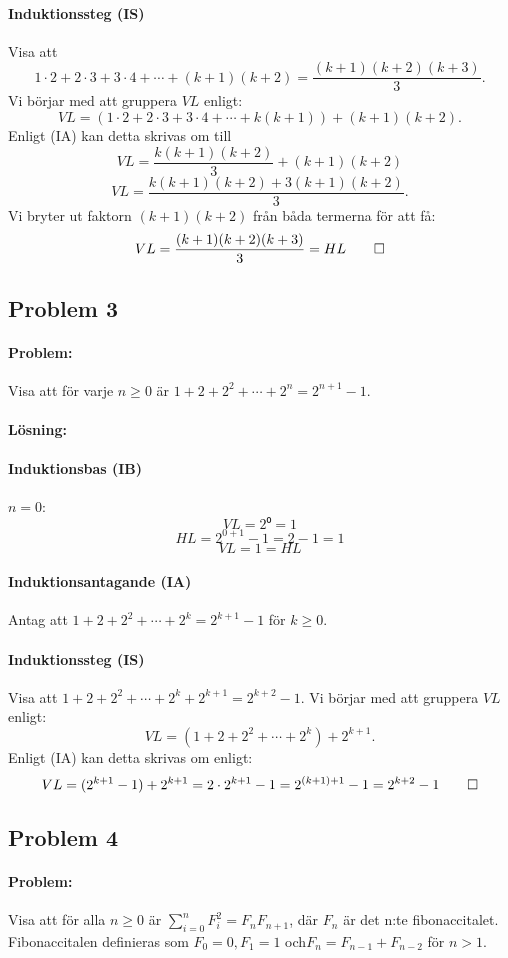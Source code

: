 \documentclass[12pt]{article}
\begin{document}
\paragraph{Induktionssteg (IS)} Visa att 
\[1\cdot 2+2\cdot 3+3\cdot 4+\cdots +(k+1)(k+2)=\frac{(k+1)(k+2)(k+3)}{3}.\]
Vi börjar med att gruppera $VL$ enligt:
\[VL = (1\cdot 2+2\cdot 3+3\cdot 4+\cdots +k(k+1))+(k+1)(k+2).\]
Enligt (IA) kan detta skrivas om till 
\[VL = \frac{k(k+1)(k+2)}{3} + (k+1)(k+2)\]
\[VL = \frac{k(k+1)(k+2) + 3(k+1)(k+2)}{3}.\]
Vi bryter ut faktorn $(k+1)(k+2)$ från båda termerna för att få:
\[VL = \frac{(k+1)(k+2)(k+3)}{3} = HL \qed\]

\subsection*{Problem 3}
\paragraph{Problem:} Visa att för varje $n\ge 0$ är \(1+2+2^2+\cdots+2^n=2^{n+1}-1.\)
\paragraph{Lösning:}
\paragraph{Induktionsbas (IB)} $n=0$:
\[VL = 2⁰ = 1\]
\[HL = 2^{0+1}-1 = 2-1 = 1\]
\[VL = 1 = HL\]
\paragraph{Induktionsantagande (IA)} Antag att \(1+2+2^2+\cdots+2^k=2^{k+1}-1\) för $k\ge0$.
\paragraph{Induktionssteg (IS)} Visa att \(1+2+2^2+\cdots+2^k+2^{k+1}=2^{k+2}-1.\)
\newline Vi börjar med att gruppera $VL$ enligt:
\[VL = (1+2+2^2+\cdots+2^k)+2^{k+1}.\]
Enligt (IA) kan detta skrivas om enligt:
\[VL = (2^{k+1}-1)+2^{k+1} = 2\cdot2^{k+1}-1 = 2^{(k+1)+1}-1 = 2^{k+2}-1 \qed\]

\newpage\noindent\subsection*{Problem 4}
\paragraph{Problem:} Visa att för alla $n\ge 0$ är \(\sum_{i=0}^nF_i^2=F_nF_{n+1}\), där $F_n$ är det n:te fibonaccitalet. Fibonaccitalen definieras som $F_0=0, F_1=1$ och\newline $F_n=F_{n-1}+F_{n-2}$ för $n>1$.
\end{document}
